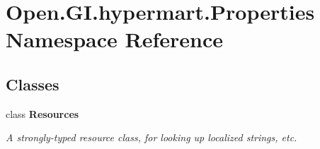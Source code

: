 \hypertarget{namespace_open_1_1_g_i_1_1hypermart_1_1_properties}{}\section{Open.\+G\+I.\+hypermart.\+Properties Namespace Reference}
\label{namespace_open_1_1_g_i_1_1hypermart_1_1_properties}
\subsection*{Classes}
\begin{DoxyCompactItemize}
\item 
class {\bfseries Resources}
\begin{DoxyCompactList}\small\item\em A strongly-\/typed resource class, for looking up localized strings, etc. \end{DoxyCompactList}\end{DoxyCompactItemize}

